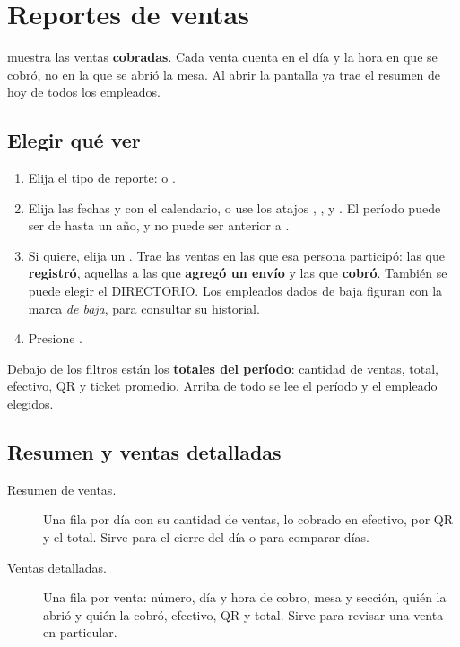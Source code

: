 \chapter{Reportes de ventas}

 muestra las ventas \textbf{cobradas}. Cada venta cuenta en el día y la hora en que se cobró, no en la que se abrió la mesa. Al abrir la pantalla ya trae el resumen de hoy de todos los empleados.


\section{Elegir qué ver}

\begin{enumerate}
  \item Elija el tipo de reporte:  o .
  \item Elija las fechas  y  con el calendario, o use los atajos , ,  y . El período puede ser de hasta un año, y  no puede ser anterior a .
  \item Si quiere, elija un . Trae las ventas en las que esa persona participó: las que \textbf{registró}, aquellas a las que \textbf{agregó un envío} y las que \textbf{cobró}. También se puede elegir el DIRECTORIO. Los empleados dados de baja figuran con la marca \textit{de baja}, para consultar su historial.
  \item Presione .
\end{enumerate}

Debajo de los filtros están los \textbf{totales del período}: cantidad de ventas, total, efectivo, QR y ticket promedio. Arriba de todo se lee el período y el empleado elegidos.

\section{Resumen y ventas detalladas}

\begin{description}
  \item[Resumen de ventas.] Una fila por día con su cantidad de ventas, lo cobrado en efectivo, por QR y el total. Sirve para el cierre del día o para comparar días.
  \item[Ventas detalladas.] Una fila por venta: número, día y hora de cobro, mesa y sección, quién la abrió y quién la cobró, efectivo, QR y total. Sirve para revisar una venta en particular.
\end{description}

